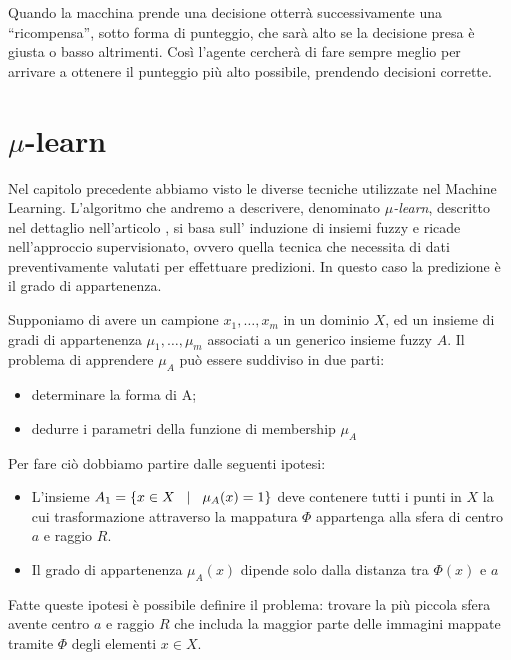 \documentclass[a4paper,12pt]{report}
\begin{document}
Quando la macchina prende una decisione otterrà successivamente una “ricompensa”, sotto forma di punteggio, che sarà alto se la decisione presa è giusta o basso altrimenti. Così l'agente cercherà di fare sempre meglio per arrivare a ottenere il punteggio più alto possibile, prendendo decisioni corrette.


\section{\texorpdfstring{$\mu$}{mu}-learn}
Nel capitolo precedente abbiamo visto le diverse tecniche utilizzate nel Machine Learning. L’algoritmo che andremo a descrivere, denominato \textit{$\mu$-learn}, descritto nel dettaglio nell'articolo \cite{mulearn}, si basa sull’ induzione di insiemi fuzzy e ricade nell’approccio supervisionato, ovvero quella tecnica che necessita di dati preventivamente valutati per effettuare predizioni. In questo caso la predizione è il grado di appartenenza.
\bigskip

Supponiamo di avere un campione {$x_1,\dots,x_m$} in un dominio $X$, ed un insieme di gradi di appartenenza {$\mu_1,\dots,\mu_m$} associati a un generico insieme fuzzy $A$. \newline
Il problema di apprendere $\mu_A$ può essere suddiviso in due parti:
\begin{itemize}
    \item determinare la forma di A;
    \item dedurre i parametri della funzione di membership $\mu_A$
\end{itemize}

\noindent Per fare ciò dobbiamo partire dalle seguenti ipotesi:
\begin{itemize}
    \item L'insieme $A_1 = \{ x\in X \hspace{0,3cm} |\hspace{0,3cm} \mu_A(x) = 1 \}$ deve contenere tutti i punti in $X$ la cui trasformazione attraverso la mappatura $\Phi$ appartenga alla sfera di centro $a$ e raggio $R$.
    
    \item Il grado di appartenenza $\mu_A(x)$ dipende solo dalla distanza tra $\Phi(x)$ e $a$
\end{itemize}

\noindent Fatte queste ipotesi è possibile definire il problema: trovare la più piccola sfera avente centro $a$ e raggio $R$ che includa la maggior parte delle immagini mappate tramite $\Phi$ degli elementi $x\in X$.
\end{document}
